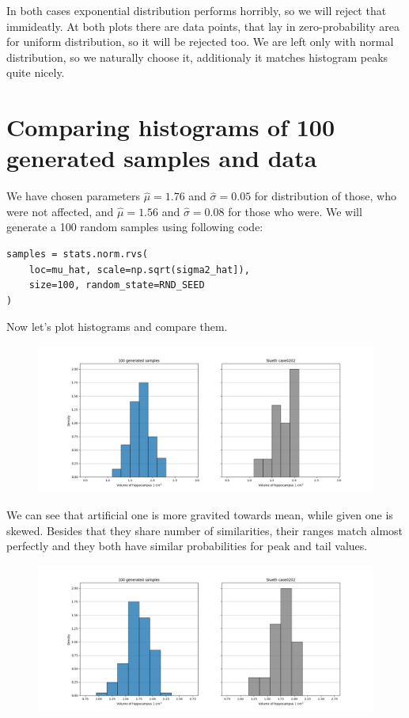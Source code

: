 \documentclass[12pt,a4paper]{article} %
\begin{document}
In both cases exponential distribution performs horribly, so we will reject that immideatly. At both plots there are data points, that lay in zero-probability area for uniform distribution, so it will be rejected too. We are left only with normal distribution, so we naturally choose it, additionaly it matches histogram peaks quite nicely.
\pagebreak

\section{Comparing histograms of 100 generated samples and data}

We have chosen parameters $\hat\mu = 1.76$ and $\hat \sigma = 0.05$ for distribution of those, who were not affected, and $\hat\mu = 1.56$ and $\hat\sigma = 0.08$ for those who were. We will generate a 100 random samples using following code:

\begin{lstlisting}
samples = stats.norm.rvs(
    loc=mu_hat, scale=np.sqrt(sigma2_hat]),
    size=100, random_state=RND_SEED
)
\end{lstlisting}

Now let's plot histograms and compare them.

\begin{figure}[h]
  \centering
  \includegraphics[width=\textwidth]{./img/comparing_generated_unaffected.png}
  \label{fig:comp_gen_unaff}
\end{figure}

We can see that artificial one is more gravited towards mean, while given one is skewed. Besides that they share number of similarities, their ranges match almost perfectly and they both have similar probabilities for peak and tail values.

\begin{figure}[h]
  \centering
  \includegraphics[width=\textwidth]{./img/comparing_generated_affected.png}
  \label{fig:comp_gen_aff}
\end{figure}
\end{document}
